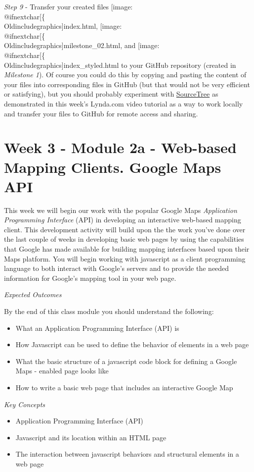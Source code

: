 \documentclass[]{book}
\makeatletter
\def\ScaleIfNeeded{%
  \ifdim\Gin@nat@width>.5\linewidth
    .5\linewidth
  \else
    \Gin@nat@width
  \fi
}
\let\Oldincludegraphics\texttt{[image: \%
 \\catcode`\\@=11\\relax\%
 \%\\gdef\\includegraphics\{\\@ifnextchar[\{\\Oldincludegraphics]}{\Oldincludegraphics[width=\ScaleIfNeeded]}}%
\gdef\texttt{[image: \\@ifnextchar[\{\\Oldincludegraphics]}{\Oldincludegraphics[max size={.75\textwidth}{.75\textheight}]}}%
\makeatother
\begin{document}
\emph{Step 9} - Transfer your created files \texttt{index.html},
\texttt{milestone\_02.html}, and \texttt{index\_styled.html} to your
GitHub repository (created in \emph{Milestone 1}). Of course you could
do this by copying and pasting the content of your files into
corresponding files in GitHub (but that would not be very efficient or
satisfying), but you should probably experiment with
\href{https://www.sourcetreeapp.com/}{SourceTree} as demonstrated in
this week's Lynda.com video tutorial as a way to work locally and
transfer your files to GitHub for remote access and sharing.

\chapter{Week 3 - Module 2a - Web-based Mapping Clients. Google Maps
API}\label{week03}

This week we will begin our work with the popular Google Maps
\emph{Application Programming Interface} (API) in developing an
interactive web-based mapping client. This development activity will
build upon the the work you've done over the last couple of weeks in
developing basic web pages by using the capabilities that Google has
made available for building mapping interfaces based upon their Maps
platform. You will begin working with javascript as a client programming
language to both interact with Google's servers and to provide the
needed information for Google's mapping tool in your web page.

\emph{Expected Outcomes}

By the end of this class module you should understand the following:

\begin{itemize}
\item
  What an Application Programming Interface (API) is
\item
  How Javascript can be used to define the behavior of elements in a web
  page
\item
  What the basic structure of a javascript code block for defining a
  Google Maps - enabled page looks like
\item
  How to write a basic web page that includes an interactive Google Map
\end{itemize}

\emph{Key Concepts}

\begin{itemize}
\item
  Application Programming Interface (API)
\item
  Javascript and its location within an HTML page
\item
  The interaction between javascript behaviors and structural elements
  in a web page
\end{itemize}
\end{document}
